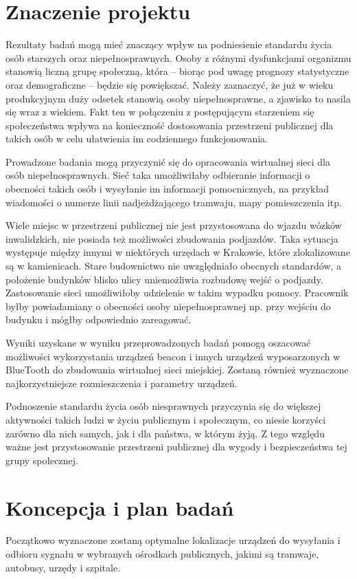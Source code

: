 \documentclass[a4paper]{article}
\begin{document}
\section{Znaczenie projektu}
Rezultaty badań mogą mieć znaczący wpływ na podniesienie standardu życia osób starszych oraz niepełnosprawnych. Osoby z różnymi dysfunkcjami organizmu stanowią liczną grupę społeczną, która -- biorąc pod uwagę prognozy statystyczne oraz demograficzne -- będzie się powiększać. Należy zaznaczyć, że już w wieku produkcyjnym duży odsetek stanowią osoby niepełnosprawne, a zjawisko to nasila się wraz z wiekiem. Fakt ten w połączeniu z postępującym starzeniem się społeczeństwa wpływa na konieczność dostosowania przestrzeni publicznej dla takich osób w celu ułatwienia im codziennego funkcjonowania. 

Prowadzone badania mogą przyczynić się do opracowania wirtualnej sieci dla osób niepełnosprawnych. Sieć taka umożliwiłaby odbieranie informacji o obecności takich osób i wysyłanie im informacji pomocnicznych, na przykład wiadomości o numerze linii nadjeżdżającego tramwaju, mapy pomieszczenia itp. 

Wiele miejsc w przestrzeni publicznej nie jest przystosowana do wjazdu wózków inwalidzkich, nie posiada też możliwości zbudowania podjazdów. Taka sytuacja występuje między innymi w niektórych urzędach w Krakowie, które zlokalizowane są w kamienicach. Stare budownictwo nie uwzględniało obecnych standardów, a położenie budynków blisko ulicy uniemożliwia rozbudowę wejść o podjazdy. Zastosowanie sieci umożliwiłoby udzielenie w takim wypadku pomocy. Pracownik byłby powiadamiany o obecności osoby niepełnosprawnej np. przy wejściu do budynku i mógłby odpowiednio zareagować. 

Wyniki uzyskane w wyniku przeprowadzonych badań pomogą oszacować możliwości wykorzystania urządzeń beacon i innych urządzeń wyposarzonych w BlueTooth do zbudowania wirtualnej sieci miejskiej. Zostaną również wyznaczone najkorzystniejsze rozmieszczenia i parametry urządzeń. 

Podnoszenie standardu życia osób niesprawnych przyczynia się do większej aktywności takich ludzi w życiu publicznym i społecznym, co niesie korzyści zarówno dla nich samych, jak i dla państwa, w którym żyją. Z tego względu ważne jest przystosowanie przestrzeni publicznej dla wygody i bezpieczeństwa tej grupy społecznej.

\section{Koncepcja i plan badań}
Początkowo wyznaczone zostaną optymalne lokalizacje urządzeń do wysyłania i odbioru sygnału w wybranych ośrodkach publicznych, jakimi są tramwaje, autobusy, urzędy i szpitale. 
\end{document}
